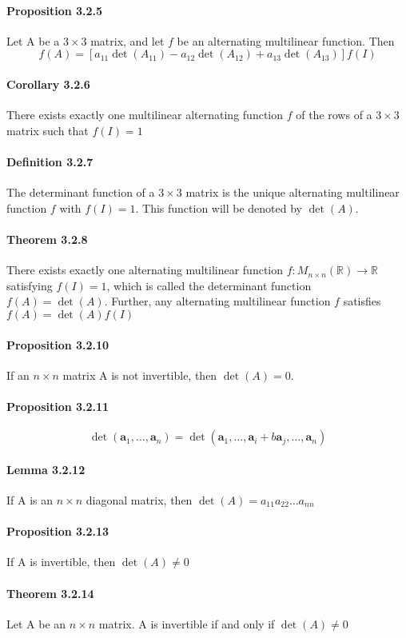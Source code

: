 \documentclass[11pt]{article}
\newcommand{\tb}[1]{\textbf{#1}}
\newcommand{\real}[0]{\mathbb{R}}
\newcommand{\va}[0]{\tb{a}}
\begin{document}
{\paragraph{Proposition 3.2.5} Let A be a $3 \times 3$ matrix, and let $f$ be an alternating multilinear function. Then
$$f(A) = [a_{11}\det(A_{11}) - a_{12}\det(A_{12}) + a_{13}\det(A_{13})]f(I)$$
\paragraph{Corollary 3.2.6} There exists exactly one multilinear alternating function $f$ of the rows of a $3 \times 3$ matrix such that $f(I) = 1$
\paragraph{Definition 3.2.7} The determinant function of a $3 \times 3$ matrix is the unique alternating multilinear function $f$ with $f(I) = 1$. This function will be denoted by $\det(A)$.
\paragraph{Theorem 3.2.8} There exists exactly one alternating multilinear function $f: M_{n\times n}(\real) \rightarrow \real$ satisfying $f(I) = 1$, which is called the determinant function $f(A) = \det(A)$. Further, any alternating multilinear function $f$ satisfies $f(A) = \det(A)f(I)$
\paragraph{Proposition 3.2.10} If an $n \times n$ matrix A is not invertible, then $\det(A) = 0$.
\paragraph{Proposition 3.2.11} $$\det(\va_1,\hdots,\va_n) = \det(\va_1,\hdots,\va_i + b\va_j, \hdots, \va_n)$$
\paragraph{Lemma 3.2.12} If A is an $n \times n$ diagonal matrix, then $\det(A) = a_{11}a_{22}\hdots a_{nn}$
\paragraph{Proposition 3.2.13} If A is invertible, then $\det(A) \neq 0$
\paragraph{Theorem 3.2.14} Let A be an $n\times n$ matrix. A is invertible if and only if $\det(A) \neq 0$
}
\end{document}
